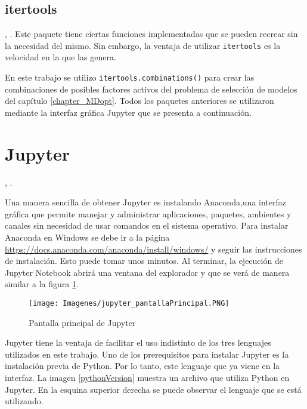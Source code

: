 \subsection{itertools}
, \cite{doc_python}. Este paquete tiene ciertas funciones implementadas que se pueden recrear sin la necesidad del mismo. Sin embargo, la ventaja de utilizar \texttt{itertools} es la velocidad en la que las genera. 

En este trabajo se utilizo \texttt{itertools.combinations()} para crear las combinaciones de posibles factores activos del problema de selección de modelos del capítulo \ref{chapter_MDopt}. Todos los paquetes anteriores se utilizaron mediante la interfaz gráfica \textsf{Jupyter} que se presenta a continuación.

\section{Jupyter} \label{cap_jupyter}
, \cite{jupyter_page}. 

Una manera sencilla de obtener \textsf{Jupyter} es instalando \textsf{Anaconda},una interfaz gráfica que permite manejar y administrar aplicaciones, paquetes, ambientes y canales sin necesidad de usar comandos en el sistema operativo. Para instalar Anaconda en Windows se debe ir a la página \url{https://docs.anaconda.com/anaconda/install/windows/} y seguir las instrucciones de instalación. Esto puede tomar unos minutos. Al terminar, la ejecución de \textsf{Jupyter Notebook} abrirá una ventana del explorador y que se verá de manera similar a la figura \ref{jupyter_pantallaPrincipal}. 


\begin{figure}[h]
	\begin{center}
		\texttt{[image: Imagenes/jupyter\_pantallaPrincipal.PNG]}
		\caption{Pantalla principal de Jupyter}
		\label{jupyter_pantallaPrincipal}
	\end{center}
\end{figure}


\textsf{Jupyter} tiene la ventaja de facilitar el uso indistinto de los tres lenguajes utilizados en este trabajo. Uno de los prerequisitos para instalar \textsf{Jupyter} es la instalación previa de \textsf{Python}. Por lo tanto, este lenguaje que ya viene en la interfaz. La imagen \ref{pythonVersion} muestra un archivo que utiliza \textsf{Python} en \textsf{Jupyter}. En la esquina superior derecha se puede observar el lenguaje que se está utilizando. 

